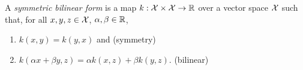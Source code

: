 A \textit{symmetric bilinear form} is a map \(k : \mathcal{X} \times \mathcal{X} \to \mathbb{R}\) over a vector space \(\mathcal{X}\) such that, for all \(x,y,z \in \mathcal{X}\), \(\alpha, \beta \in \mathbb{R}\),
\begin{enumerate}
    \item \(k(x,y) = k(y,x)\) and
    \hfill (symmetry)
    \item \(k(\alpha x + \beta y, z) = \alpha k(x,z) + \beta k(y,z)\).
    \hfill (bilinear)
\end{enumerate}